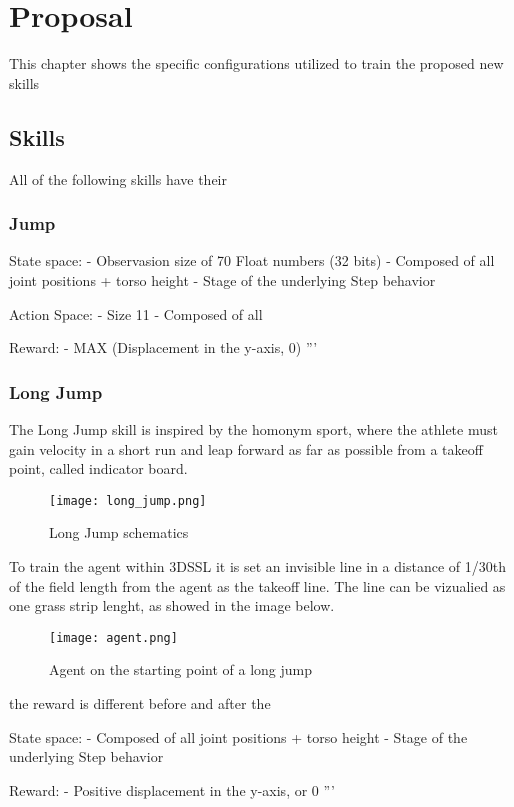 \chapter{Proposal}
\label{cap:Proposal}



This chapter shows the specific configurations utilized to train the proposed new skills
\section{Skills}
All of the following skills have their 

\subsection{Jump}

State space:
- Observasion size of 70 Float numbers (32 bits)
- Composed of all joint positions + torso height
- Stage of the underlying Step behavior

Action Space:
- Size 11
- Composed of all 

Reward:
- MAX (Displacement in the y-axis, 0)
'''

\subsection{Long Jump}

The Long Jump skill is inspired by the homonym sport, where the athlete must gain velocity in a short run and leap forward as far as possible from a takeoff point, called indicator board.

\begin{figure}[!htb]
\centering
\texttt{[image: long\_jump.png]}
\caption{Long Jump schematics}
\label{fig:long_jump_schematics}
\end{figure}

To train the agent within 3DSSL it is set an invisible line in a distance of 1/30th of the field length from the agent as the takeoff line. The line can be vizualied as one grass strip lenght, as showed in the image below.


\begin{figure}[!htb]
\centering
\texttt{[image: agent.png]}
\caption{Agent on the starting point of a long jump}
\label{fig:3DSSL_robot}
\end{figure}

the reward is different before and after the 


State space:
- Composed of all joint positions + torso height
- Stage of the underlying Step behavior

Reward:
- Positive displacement in the y-axis, or 0
'''
